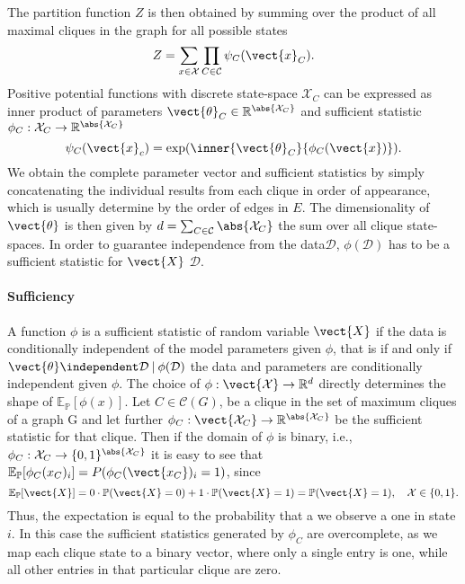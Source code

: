 The partition function $Z$ is then obtained by summing over the product of all maximal cliques in the graph for all possible states
\begin{equation}
    Z = \sum_{x\in \mathcal{X}} \prod_{C \in \mathcal{C}} \psi_C(\vect{x}_C).
\end{equation}
Positive potential functions with discrete state-space $\mathcal{X}_C$ can be expressed as inner product of parameters $\vect{\theta}_C \in \mathbb{R}^{\abs{\mathcal{X}_C}}$ and sufficient statistic $\phi_C: \mathcal{X}_C \rightarrow \mathbb{R}^{\abs{\mathcal{X}_C}}$ 
\begin{equation}
    \psi_C(\vect{x}_c) = \exp(\inner{\vect{\theta}_C}{\phi_C(\vect{x})}).
\end{equation}
We obtain the complete parameter vector and sufficient statistics by simply concatenating the individual results from each clique in order of appearance, which is usually determine by the order of edges in $E$.
The dimensionality of $\vect{\theta}$ is then given by $d = \sum_{C \in \mathcal{C}} \abs{\mathcal{X}_C}$ the sum over all clique state-spaces.
In order to guarantee independence from the data$\mathcal{D}$,  $\phi(\mathcal{D})$ has to be a sufficient statistic for $\vect{X}$ \wrt $\mathcal{D}$.
\paragraph*{Sufficiency}
    A function $\phi$  is a sufficient statistic of random variable $\vect{X}$ if the data is conditionally independent of the model parameters given $\phi$, that is if and only if $\vect{\theta}\independent \mathcal{D} \:\lvert\: \phi(\mathcal{D})$ the data and parameters are conditionally independent given $\phi$.
    The choice of $\phi: \vect{\mathcal{X}} \rightarrow \mathbb{R}^d$ directly determines the shape of  $\mathbb{E}_{\mathbb{P}}[\phi(x)]$.
    Let $C \in \mathcal{C}(G)$, be a clique in the set of maximum cliques of a graph G and let further
    $\phi_C: \vect{\mathcal{X}_C} \rightarrow \mathbb{R}^{\abs{\mathcal{X}_C}}$ be the sufficient statistic for that clique.
    Then if the domain of $\phi$ is binary, i.e., $\phi_C : \mathcal{X}_C \rightarrow \{0,1\}^{\abs{\mathcal{X}_C}}$ it is easy to see that  $\mathbb{E}_{\mathbb{P}}[\phi_C(x_C)_i] = P(\phi_C(\vect{x_C})_i = 1)$, since
    \begin{equation}
        \mathbb{E}_{\mathbb{P}}[\vect{X}] = 0 \cdot \mathbb{P}(\vect{X} = 0) + 1 \cdot \mathbb{P}(\vect{X}= 1) = \mathbb{P}(\vect{X} = 1), \quad \mathcal{X} \in \{0,1\}.
    \end{equation}
    Thus, the expectation is equal to the probability that a we observe a one in state $i$.
    In this case the sufficient statistics generated by $\phi_C$ are overcomplete, as we map each clique state to a binary vector, where only a single entry is one, while all other entries in that particular clique are zero.  

